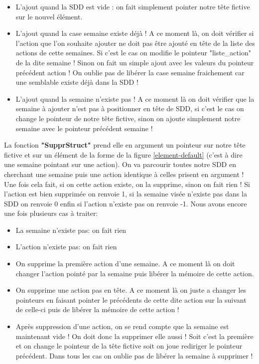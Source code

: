 \documentclass[12pt,french]{article} %
\begin{document}
\begin{itemize}
	\item L'ajout quand la SDD est vide : on fait simplement pointer notre tête fictive sur le nouvel élément.
	\item L'ajout quand la case semaine existe déjà ! A ce moment là, on doit vérifier si l'action que l'on souhaite ajouter ne doit pas être ajouté en tête de la liste des actions de cette semaines. Si c'est le cas on modifie le pointeur "liste\_action" de la dite semaine ! Sinon on fait un simple ajout avec les valeurs du pointeur précédent action ! On oublie pas de libérer la case semaine fraichement car une semblable existe déjà dans la SDD ! 
	\item L'ajout quand la semaine n'existe pas ! A ce moment là on doit vérifier que la semaine à ajouter n'est pas à positionner en tête de SDD, si c'est le cas on change le pointeur de notre tête fictive, sinon on ajoute simplement notre semaine avec le pointeur précédent semaine !\newline
\end{itemize}

La fonction \textbf{"SupprStruct"} prend elle en argument un pointeur sur notre tête fictive et sur un élément de la forme de la figure \ref{element-default} (c'est à dire une semaine pointant sur une action). On va parcourir toutes notre SDD en cherchant une semaine puis une action identique à celles prisent en argument ! Une fois cela fait, si on cette action existe, on la supprime, sinon on fait rien ! Si l'action est bien supprimée on renvoie 1, si la semaine visée n'existe pas dans la SDD on renvoie 0 enfin si l'action n'existe pas on renvoie -1.  Nous avons encore une fois plusieurs cas à traiter:

\begin{itemize}
	\item La semaine n'existe pas: on fait rien
	\item L'action n'existe pas: on fait rien
	\item On supprime la première action d'une semaine. A ce moment là on doit changer l'action pointé par la semaine puis libérer la mémoire de cette action.
	\item On supprime une action pas en tête. A ce moment là on juste a changer les pointeurs en faisant pointer le précédents de cette dite action sur la suivant de celle-ci puis de libérer la mémoire de cette action !
	\item Après suppression d'une action, on se rend compte que la semaine est maintenant vide ! On doit donc la supprimer elle aussi ! Soit c'est la première et on change le pointeur de la tête fictive soit on joue rediriger le pointeur précédent. Dans tous les cas on oublie pas de libérer la semaine à supprimer !\newline
\end{itemize}
\end{document}
